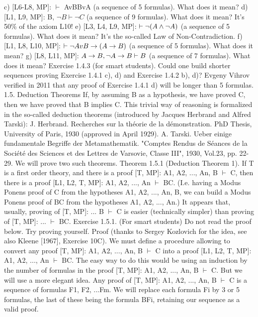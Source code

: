 c) [L6-L8, MP]: \(\vdash\) AvB\IMPLIES BvA (a sequence of 5 formulas). What does it mean?
d) [L1, L9, MP]: B, \(\neg B \vdash \neg C\) (a sequence of 9 formulas). What does it mean? It's 50\% of the axiom L10!
e) [L3, L4, L9, MP]: \(\vdash \neg (A\wedge \neg A)\) (a sequence of 5 formulas). What does it mean? It's the so-called Law of
Non-Contradiction.
f) [L1, L8, L10, MP]: \(\vdash \neg AvB\rightarrow (A\rightarrow B)\) (a sequence of 5 formulas). What does it mean?
g) [L8, L11, MP]: \(A\rightarrow B, \neg A\rightarrow B \vdash B\) (a sequence of 7 formulas). What does it mean?
Exercise 1.4.3 (for smart students). Could one build shorter sequences proving Exercise 1.4.1 c), d) and
Exercise 1.4.2 b), d)? Evgeny Vihrov verified in 2011 that any proof of Exercise 1.4.1 d) will be longer
than 5 formulas.
1.5. Deduction Theorems
If, by assuming B as a hypothesis, we have proved C, then we have proved that B implies C. This trivial
way of reasoning is formalized in the so-called deduction theorems (introduced by Jacques Herbrand
and Alfred Tarski):
J. Herbrand. Recherches sur la théorie de la démonstration. PhD Thesis, University of Paris, 1930 (approved in April 1929).
A. Tarski. Ueber einige fundamentale Begriffe der Metamathematik. "Comptes Rendus de Séances de la Société des Sciences
et des Lettres de Varsovie, Classe III", 1930, Vol.23, pp. 22-29.
We will prove two such theorems.
Theorem 1.5.1 (Deduction Theorem 1). If T is a first order theory, and there is a proof [T, MP]: A1,
A2, ..., An, B \(\vdash\) C, then there is a proof [L1, L2, T, MP]: A1, A2, ..., An \(\vdash\) B\IMPLIES C. (I.e. having a Modus
Ponens proof of C from the hypotheses A1, A2, ..., An, B, we can build a Modus Ponens proof of B\IMPLIES C
from the hypotheses A1, A2, ..., An.)
It appears that, usually, proving of [T, MP]: ... B \(\vdash\) C is easier (technically simpler) than proving of [T,
MP]: ... \(\vdash\) B\IMPLIES C.
Exercise 1.5.1. (For smart students) Do not read the proof below. Try proving yourself.
Proof (thanks to Sergey Kozlovich for the idea, see also Kleene [1967], Exercise 10C). We must define a
procedure allowing to convert any proof [T, MP]: A1, A2, ..., An, B \(\vdash\) C into a proof [L1, L2, T, MP]: A1,
A2, ..., An \(\vdash\) B\IMPLIES C.
The easy way to do this would be using an induction by the number of formulas in the proof [T, MP]: A1,
A2, ..., An, B \(\vdash\) C. But we will use a more elegant idea. Any proof of [T, MP]: A1, A2, ..., An, B \(\vdash\) C is a
sequence of formulas F1, F2, ...Fm. We will replace each formula Fi by 3 or 5 formulas, the last of these
being the formula B\IMPLIES Fi, retaining our sequence as a valid proof.
